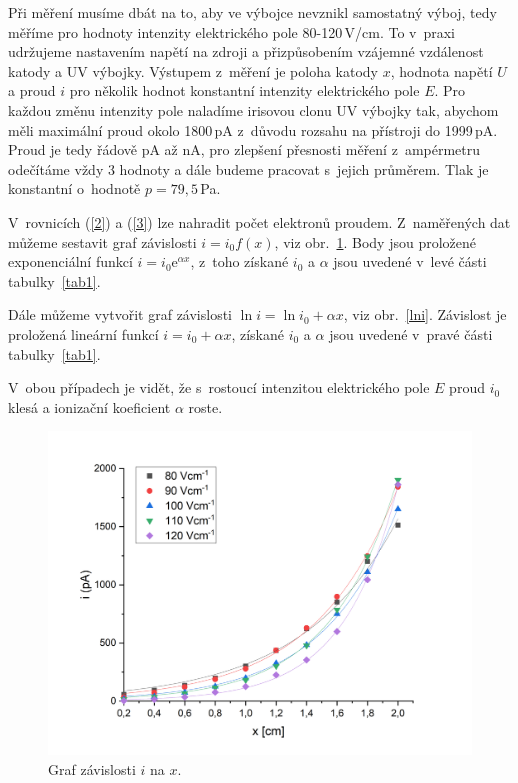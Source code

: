 \documentclass[a4paper,12pt]{article}
\newcommand{\e}{\text{e}}
\begin{document}
Při měření musíme dbát na to, aby ve výbojce nevznikl samostatný výboj, tedy 
měříme pro hodnoty intenzity elektrického pole 80-120\,V/cm. To v~praxi 
udržujeme nastavením napětí na zdroji a přizpůsobením vzájemné vzdálenost 
katody a UV výbojky. Výstupem z~měření je poloha katody $x$, hodnota napětí $U$ 
a proud $i$ pro několik hodnot konstantní intenzity elektrického pole $E$. Pro 
každou změnu intenzity pole naladíme irisovou clonu UV výbojky tak, abychom 
měli maximální proud okolo 1800\,pA z~důvodu rozsahu na přístroji do 1999\,pA. 
Proud je tedy řádově pA až nA, pro zlepšení přesnosti měření z~ampérmetru 
odečítáme vždy 3 hodnoty a dále budeme pracovat s~jejich průměrem. Tlak je 
konstantní o~hodnotě $p = 79,5$\,Pa.

V~rovnicích (\ref{2}) a (\ref{3}) lze nahradit počet elektronů proudem. 
Z~naměřených dat můžeme sestavit graf závislosti $i = i_0 f(x)$, viz 
obr.~\ref{ifx}. Body jsou proložené exponenciální funkcí $i = i_0 \e^{\alpha 
x}$, z~toho získané $i_0$ a $\alpha$ jsou uvedené v~levé části 
tabulky~\ref{tab1}.

Dále můžeme vytvořit graf závislosti $\ln i = \ln i_0 + \alpha x$, viz 
obr.~\ref{lni}. Závislost je proložená lineární funkcí $i = i_0 + \alpha x$, 
získané $i_0$ a $\alpha$ jsou uvedené v~pravé části tabulky~\ref{tab1}.

V~obou případech je vidět, že s~rostoucí intenzitou elektrického pole $E$ proud $i_0$ klesá a ionizační koeficient $\alpha$ roste.

\begin{figure}[h!]
	\centering
	\includegraphics[width=145mm]{ifx.png}
	\caption{Graf závislosti $i$ na $x$.}
	\label{ifx}
\end{figure}
\end{document}
